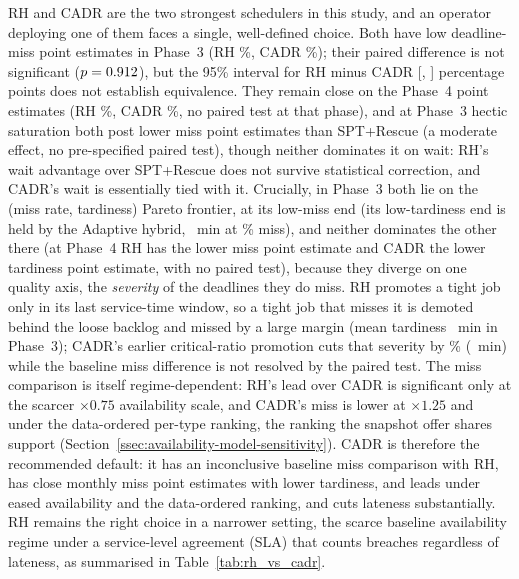 {RH and CADR are the two strongest schedulers in this study, and an operator deploying one of them faces a single, well-defined choice. Both have low deadline-miss point estimates in Phase~3 (RH \RHMiss\%, CADR \CADRmiss\%); their paired difference is not significant ($p=0.912$), but the 95\% interval for RH minus CADR [\RHCADRmissMDLo, \RHCADRmissMDHi] percentage points does not establish equivalence. They remain close on the Phase~4 point estimates (RH \PhFourRHMiss\%, CADR \PhFourCADRMiss\%, no paired test at that phase), and at Phase~3 hectic saturation both post lower miss point estimates than SPT+Rescue (a moderate effect, no pre-specified paired test), though neither dominates it on wait: RH's wait advantage over SPT+Rescue does not survive statistical correction, and CADR's wait is essentially tied with it. Crucially, in Phase~3 both lie on the (miss rate, tardiness) Pareto frontier, at its low-miss end (its low-tardiness end is held by the Adaptive hybrid, \AdaptiveTard~min at \AdaptiveMiss\% miss), and neither dominates the other there (at Phase~4 RH has the lower miss point estimate and CADR the lower tardiness point estimate, with no paired test), because they diverge on one quality axis, the \emph{severity} of the deadlines they do miss. RH promotes a tight job only in its last service-time window, so a tight job that misses it is demoted behind the loose backlog and missed by a large margin (mean tardiness \RHtard~min in Phase~3); CADR's earlier critical-ratio promotion cuts that severity by \CADRtardReduction\% (\CADRtard~min) while the baseline miss difference is not resolved by the paired test. The miss comparison is itself regime-dependent: RH's lead over CADR is significant only at the scarcer $\times 0.75$ availability scale, and CADR's miss is lower at $\times 1.25$ and under the data-ordered per-type ranking, the ranking the snapshot offer shares support (Section~\ref{ssec:availability-model-sensitivity}). CADR is therefore the recommended default: it has an inconclusive baseline miss comparison with RH, has close monthly miss point estimates with lower tardiness, and leads under eased availability and the data-ordered ranking, and cuts lateness substantially. RH remains the right choice in a narrower setting, the scarce baseline availability regime under a service-level agreement (SLA) that counts breaches regardless of lateness, as summarised in Table~\ref{tab:rh_vs_cadr}.

}
